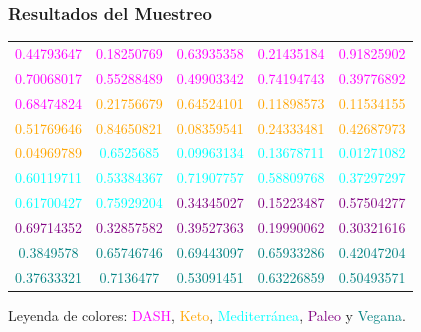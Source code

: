 \documentclass[12pt,a4paper]{article}
\begin{document}
    \subsubsection{Resultados del Muestreo}
        \begin{center}
            \begin{tabular}{ccccc}
                \textcolor{magenta}{0.44793647} & \textcolor{magenta}{0.18250769} & \textcolor{magenta}{0.63935358} & \textcolor{magenta}{0.21435184} & \textcolor{magenta}{0.91825902} \\
                \textcolor{magenta}{0.70068017} & \textcolor{magenta}{0.55288489} & \textcolor{magenta}{0.49903342} & \textcolor{magenta}{0.74194743} & \textcolor{magenta}{0.39776892} \\
                \textcolor{magenta}{0.68474824} & \textcolor{orange}{0.21756679} & \textcolor{orange}{0.64524101} & \textcolor{orange}{0.11898573} & \textcolor{orange}{0.11534155} \\
                \textcolor{orange}{0.51769646} & \textcolor{orange}{0.84650821} & \textcolor{orange}{0.08359541} & \textcolor{orange}{0.24333481} & \textcolor{orange}{0.42687973} \\
                \textcolor{orange}{0.04969789} & \textcolor{cyan}{0.6525685}  & \textcolor{cyan}{0.09963134} & \textcolor{cyan}{0.13678711} & \textcolor{cyan}{0.01271082} \\
                \textcolor{cyan}{0.60119711} & \textcolor{cyan}{0.53384367} & \textcolor{cyan}{0.71907757} & \textcolor{cyan}{0.58809768} & \textcolor{cyan}{0.37297297} \\
                \textcolor{cyan}{0.61700427} & \textcolor{cyan}{0.75929204} & \textcolor{purple}{0.34345027} & \textcolor{purple}{0.15223487} & \textcolor{purple}{0.57504277} \\
                \textcolor{purple}{0.69714352} & \textcolor{purple}{0.32857582} & \textcolor{purple}{0.39527363} & \textcolor{purple}{0.19990062} & \textcolor{purple}{0.30321616} \\
                \textcolor{teal}{0.3849578}  & \textcolor{teal}{0.65746746} & \textcolor{teal}{0.69443097} & \textcolor{teal}{0.65933286} & \textcolor{teal}{0.42047204} \\
                \textcolor{teal}{0.37633321} & \textcolor{teal}{0.7136477}  & \textcolor{teal}{0.53091451} & \textcolor{teal}{0.63226859} & \textcolor{teal}{0.50493571} 
            \end{tabular}
        \end{center}
        Leyenda de colores: \textcolor{magenta}{DASH}, \textcolor{orange}{Keto}, \textcolor{cyan}{Mediterránea}, 
        \textcolor{purple}{Paleo} y \textcolor{teal}{Vegana}.
\end{document}

